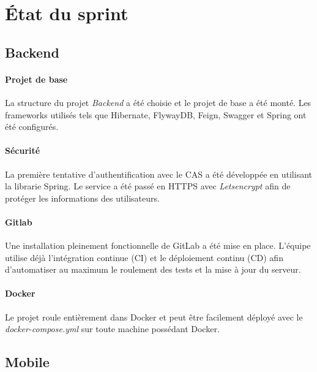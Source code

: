 \section{État du sprint}
	
	\subsection{Backend}

	\paragraph{Projet de base} La structure du projet \emph{Backend} a été choisie et le projet de base a été monté. Les frameworks utilisés tels que Hibernate, FlywayDB, Feign, Swagger et Spring ont été configurés.

	\paragraph{Sécurité} La première tentative d'authentification avec le CAS a été développée en utilisant la librarie Spring. Le service a été passé en HTTPS avec \emph{Letsencrypt} afin de protéger les informations des utilisateurs.
	
	\paragraph{Gitlab} Une installation pleinement fonctionnelle de GitLab a été mise en place. L'équipe utilise déjà l'intégration continue (CI) et le déploiement continu (CD) afin d'automatiser au maximum le roulement des tests et la mise à jour du serveur.
	
	\paragraph{Docker} Le projet roule entièrement dans Docker et peut être facilement déployé avec le \emph{docker-compose.yml} sur toute machine possédant Docker.
		
	\subsection{Mobile}

